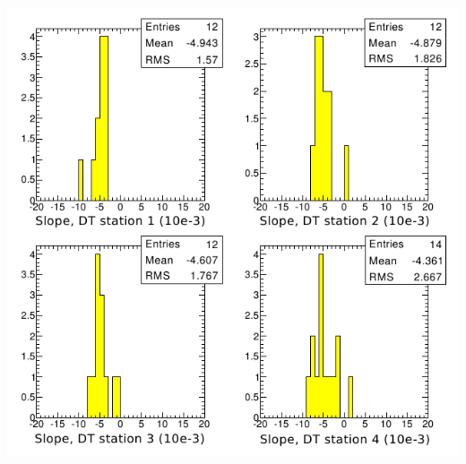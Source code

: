 \documentclass[compress]{beamer}
\begin{document}
\begin{frame}
\begin{columns}
\includegraphics[width=\linewidth]{growth_with_station3.png}
\end{columns}
\end{frame}
\end{document}
